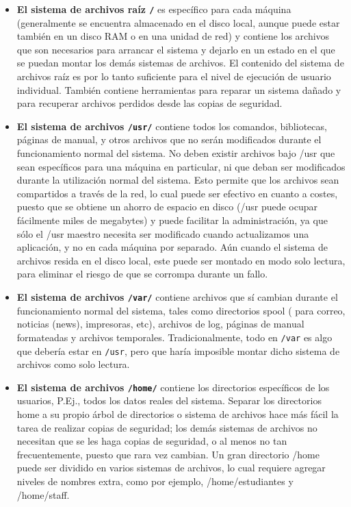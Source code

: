 \begin{itemize} 
\item{ \textbf{El sistema de archivos raíz \texttt{/}} es específico para
cada máquina (generalmente se encuentra almacenado en el disco local, aunque
puede estar también en un disco RAM o en una unidad de red) y contiene los
archivos que son necesarios para arrancar el sistema y dejarlo en un estado en
el que se puedan montar los demás sistemas de archivos. El contenido del sistema
de archivos raíz es por lo tanto suficiente para el nivel de ejecución de
usuario individual. También contiene herramientas para reparar un sistema dañado
y para recuperar archivos perdidos desde las copias de seguridad.
}

\item{ \textbf{El sistema de archivos \texttt{/usr/}}  contiene todos los comandos,
bibliotecas, páginas de manual, y otros archivos que no serán modificados durante
el funcionamiento normal del sistema. No deben existir archivos bajo /usr que
sean específicos para una máquina en particular, ni que deban ser modificados
durante la utilización normal del sistema. Esto permite que los archivos sean
compartidos a través de la red, lo cual puede ser efectivo en cuanto a costes,
puesto que se obtiene un ahorro de espacio en disco (/usr puede ocupar
fácilmente miles de megabytes) y puede facilitar la administración, ya que sólo
el /usr maestro necesita ser modificado cuando actualizamos una aplicación, y no
en cada máquina por separado. Aún cuando el sistema de archivos resida en el
disco local, este puede ser montado en modo solo lectura, para eliminar el
riesgo de que se corrompa durante un fallo.  }

\item{  \textbf{El sistema de archivos \texttt{/var/}}  contiene
archivos que sí cambian durante el funcionamiento normal del sistema, tales como
directorios spool ( para correo, noticias (news), impresoras, etc), archivos de
log, páginas de manual formateadas y archivos temporales.  Tradicionalmente,
todo en \texttt{/var} es algo que debería estar en
\texttt{/usr}, pero que haría imposible montar dicho
sistema de archivos como solo lectura. }

\item{ \textbf{El sistema de archivos \texttt{/home/}}  contiene los directorios
específicos de los usuarios, P.Ej., todos los datos reales del sistema. Separar
los directorios home a su propio árbol de directorios o sistema de archivos hace
más fácil la tarea de realizar copias de seguridad; los demás sistemas de
archivos no necesitan que se les haga copias de seguridad, o al menos no tan
frecuentemente, puesto que  rara vez cambian. Un gran directorio /home puede ser
dividido en varios sistemas de archivos, lo cual requiere agregar niveles de
nombres extra, como por ejemplo, /home/estudiantes y /home/staff.
}
\end{itemize}


